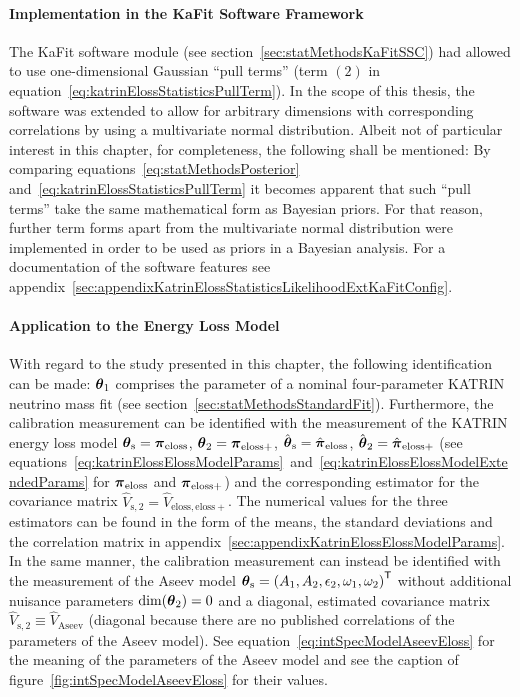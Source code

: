 \paragraph{Implementation in the KaFit Software Framework}
The KaFit software module (see section~\ref{sec:statMethodsKaFitSSC}) had allowed to use one-dimensional Gaussian ``pull terms'' (term $(2)$ in equation~\ref{eq:katrinElossStatisticsPullTerm}). In the scope of this thesis, the software was extended to allow for arbitrary dimensions with corresponding correlations by using a multivariate normal distribution. Albeit not of particular interest in this chapter, for completeness, the following shall be mentioned: By comparing equations~\eqref{eq:statMethodsPosterior} and~\eqref{eq:katrinElossStatisticsPullTerm} it becomes apparent that such ``pull terms'' take the same mathematical form as Bayesian priors. For that reason, further term forms apart from the multivariate normal distribution were implemented in order to be used as priors in a Bayesian analysis. For a documentation of the software features see appendix~\ref{sec:appendixKatrinElossStatisticsLikelihoodExtKaFitConfig}.

\paragraph{Application to the Energy Loss Model}
With regard to the study presented in this chapter, the following identification can be made: $\boldsymbol{\mathbf{\theta}}_1$ comprises the parameter of a nominal four-parameter KATRIN neutrino mass fit (see section~\ref{sec:statMethodsStandardFit}). Furthermore, the calibration measurement can be identified with the measurement of the KATRIN energy loss model $\boldsymbol{\mathbf{\theta}}_\mathrm{s}=\boldsymbol{\mathbf{\pi}}_\mathrm{eloss}$, $\boldsymbol{\mathbf{\theta}}_2=\boldsymbol{\mathbf{\pi}}_\mathrm{eloss+}$, $\hat{\boldsymbol{\mathbf{\theta}}}_\mathrm{s}=\hat{\boldsymbol{\mathbf{\pi}}}_\mathrm{eloss}$, $\hat{\boldsymbol{\mathbf{\theta}}}_2=\hat{\boldsymbol{\mathbf{\pi}}}_\mathrm{eloss+}$ (see equations~\ref{eq:katrinElossElossModelParams}~and~\ref{eq:katrinElossElossModelExtendedParams} for $\boldsymbol{\mathbf{\pi}}_\mathrm{eloss}$ and $\boldsymbol{\mathbf{\pi}}_\mathrm{eloss+}$) and the corresponding estimator for the covariance matrix $\hat{V}_\mathrm{s,2}=\hat{V}_\mathrm{eloss,eloss+}$. The numerical values for the three estimators can be found in the form of the means, the standard deviations and the correlation matrix in appendix~\ref{sec:appendixKatrinElossElossModelParams}. In the same manner, the calibration measurement can instead be identified with the measurement of the Aseev model $\boldsymbol{\mathbf{\theta}}_\mathrm{s}={(A_1, A_2,\epsilon_2,\omega_1,\omega_2)}^{\mathsf{T}}$ without additional nuisance parameters $\mathrm{dim}(\boldsymbol{\mathbf{\theta}}_2)=0$ and a diagonal, estimated covariance matrix $\hat{V}_\mathrm{s,2}\equiv\hat{V}_\mathrm{Aseev}$ (diagonal because there are no published correlations of the parameters of the Aseev model). See equation~\eqref{eq:intSpecModelAseevEloss} for the meaning  of the parameters of the Aseev model and see the caption of figure~\ref{fig:intSpecModelAseevEloss} for their values.

